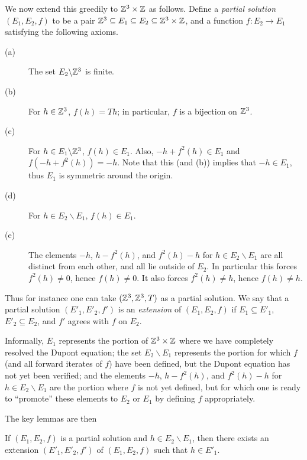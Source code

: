 We now extend this greedily to $\mathbb{Z}^3 \times \mathbb{Z}$ as follows.  Define a \emph{partial solution} $(E_1,E_2,f)$ to be a pair $\mathbb{Z}^3 \subseteq E_1 \subseteq E_2 \subseteq \mathbb{Z}^3 \times \mathbb{Z}$, and a function $f: E_2 \to E_1$ satisfying the following axioms.
\begin{description}
  \item[(a)] The set $E_2 \backslash \mathbb{Z}^3$ is finite.
  \item[(b)] For $h \in \mathbb{Z}^3$, $f(h) = Th$; in particular, $f$ is a bijection on $\mathbb{Z}^3$.
  \item[(c)] For $h \in E_1 \backslash \mathbb{Z}^3$, $f(h) \in E_1$.  Also, $-h + f^2(h) \in E_1$ and $f(-h + f^2(h)) = -h$. Note that this (and (b)) implies that $-h \in E_1$, thus $E_1$ is symmetric around the origin.
  \item[(d)] For $h \in E_2 \backslash E_1$, $f(h) \in E_1$.
  \item[(e)] The elements $-h$, $h - f^2(h)$, and $f^2(h) - h$ for $h \in E_2 \backslash E_1$ are all distinct from each other, and all lie outside of $E_2$.  In particular this forces $f^2(h) \neq 0$, hence $f(h) \neq 0$. It also forces $f^2(h) \neq h$, hence $f(h) \neq h$.
\end{description}
Thus for instance one can take $(\mathbb{Z}^3,\mathbb{Z}^3,T)$ as a partial solution.  We say that a partial solution $(E'_1, E'_2, f')$ is an \emph{extension} of $(E_1,E_2,f)$ if $E_1 \subseteq E'_1$, $E'_2 \subseteq E_2$, and $f'$ agrees with $f$ on $E_2$.

Informally, $E_1$ represents the portion of $\mathbb{Z}^3 \times \mathbb{Z}$ where we have completely resolved the Dupont equation; the set $E_2 \backslash E_1$ represents the portion for which $f$ (and all forward iterates of $f$) have been defined, but the Dupont equation has not yet been verified; and the elements $-h$, $h - f^2(h)$, and $f^2(h) - h$ for $h \in E_2 \backslash E_1$ are the portion where $f$ is not yet defined, but for which one is ready to ``promote'' these elements to $E_2$ or $E_1$ by defining $f$ appropriately.

The key lemmas are then

\begin{lemma}[Promoting to $E_1$]\label{add-E1}  If $(E_1,E_2,f)$ is a partial solution and $h \in E_2 \backslash E_1$, then there exists an extension $(E'_1,E'_2,f')$ of $(E_1,E_2,f)$ such that $h \in E'_1$.
\end{lemma}


